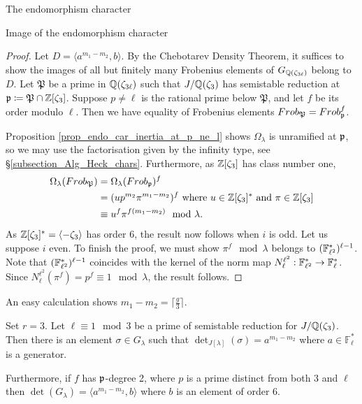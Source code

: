 \documentclass[11pt,a4paper]{article}
\newcommand{\Fl}{\mathbb{F}_\ell}
\newcommand{\B}{\mathfrak{P}}
\newcommand{\Gcyclo}[1]{G_{\QQ(\zeta_{#1})}}
\newcommand{\Glam}{G_{\lambda}}
\begin{document}
\begin{section}{The endomorphism character}
\begin{subsection}{Image of the endomorphism character}
\begin{proof}
Let $D = \langle a^{m_1-m_2},b\rangle$. By the Chebotarev Density Theorem, it suffices to show the images of all but finitely many Frobenius elements of $\Gcyclo{3 \ell}$ belong to  $D$.
Let $\B$ be a prime in $\mathbb{Q}(\zeta_{3\ell})$ such that $J/\mathbb{Q}(\zeta_3)$ has semistable reduction at $\p \coloneqq \B \cap \ZZ[\zeta_3]$.
Suppose $p \neq \ell$ is the rational prime below $\B$, and let $f$ be its order modulo $\ell$. Then we have equality of Frobenius elements $\Frob_\B = \Frob_\p^f$.

Proposition \ref{prop_endo_car_inertia_at_p_ne_l} shows $\Omega_\lambda$ is unramified at $\mathfrak{p}$, so we may use the factorisation given by the infinity type, see \S \ref{subsection_Alg_Heck_chars}. Furthermore, as $\mathbb{Z}[\zeta_3]$ has class number one,
\begin{align*}
    \Omega_\lambda(\Frob_\B) & = \Omega_\lambda(\Frob_\p)^f \\
     &= (up^{m_2}\pi^{m_1-m_2})^f \text{ where $u\in \ZZ[\zeta_3]^*$ and $\pi \in \ZZ[\zeta_3]$}\\
    & \equiv u^f\pi^{f(m_1-m_2)} \mod{\lambda}.
\end{align*}
As $\mathbb{Z}[\zeta_3]^*=\langle -\zeta_3 \rangle$ has order 6, the result now follows when $i$ is odd.
Let us suppose $i$ even.
To finish the proof, we must show $\pi^f \mod{\lambda}$ belongs to $(\mathbb{F}_{\ell^2}^*)^{\ell-1}$.
Note that $(\mathbb{F}_{\ell^2}^*)^{\ell-1}$ coincides with the kernel of the norm map $N_\ell^{\ell^2}:\FF_{\ell^2}^* \rightarrow \Fl^*$.
Since $N_\ell^{\ell^2}(\pi^f)=p^f \equiv 1 \mod{\lambda}$, the result follows.
\end{proof}

\begin{remark}
\label{remark_ceiling_of_g_over_3}
An easy calculation shows $m_1-m_2=\lceil \frac{g}{3} \rceil$.
\end{remark}



\begin{proposition}
\label{Prop_l_1_mod_3_full_Glam}
Set $r =3$. Let $\ell \equiv 1 \mod{3}$ be a prime of semistable reduction for $J/\mathbb{Q}(\zeta_3)$. Then there is an element $\sigma \in \Glam$ such that $\det_{J[\lambda]}(\sigma) = a^{m_1-m_2}$ where $a \in \Fl^*$ is a generator.

Furthermore, if $f$ has $\mathfrak{p}$-degree 2, where $p$ is a prime distinct from both $3$ and $\ell$ then $\det(\Glam)= \langle a^{m_1-m_2},b\rangle $
 where $b$ is an element of order $6$.


\end{proposition}
\end{subsection}
\end{section}
\end{document}
